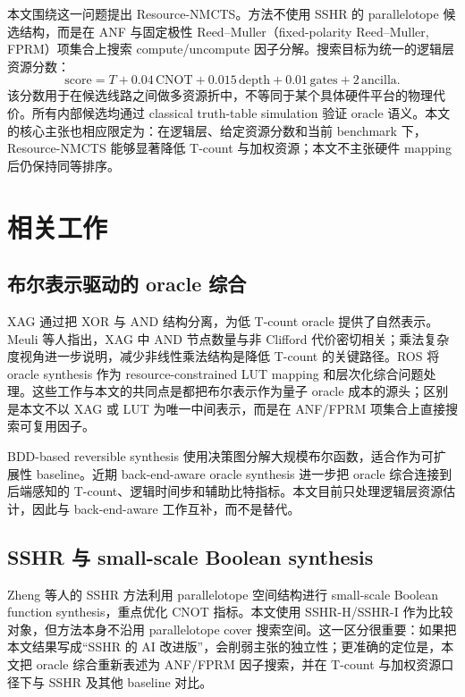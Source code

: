 \documentclass[UTF8,fontset=macnew,11pt]{ctexart}
\newcommand{\method}{Resource-NMCTS}
\newcommand{\score}{\mathrm{score}}
\begin{document}
本文围绕这一问题提出 \method{}。方法不使用 SSHR 的 parallelotope 候选结构，而是在 ANF 与固定极性 Reed--Muller（fixed-polarity Reed--Muller, FPRM）项集合上搜索 compute/uncompute 因子分解。搜索目标为统一的逻辑层资源分数：
\begin{equation}
  \score = T + 0.04\,\mathrm{CNOT} + 0.015\,\mathrm{depth}
         + 0.01\,\mathrm{gates} + 2\,\mathrm{ancilla}.
  \label{eq:score}
\end{equation}
该分数用于在候选线路之间做多资源折中，不等同于某个具体硬件平台的物理代价。所有内部候选均通过 classical truth-table simulation 验证 oracle 语义。本文的核心主张也相应限定为：在逻辑层、给定资源分数和当前 benchmark 下，\method{} 能够显著降低 T-count 与加权资源；本文不主张硬件 mapping 后仍保持同等排序。

\section{相关工作}

\subsection{布尔表示驱动的 oracle 综合}

XAG 通过把 XOR 与 AND 结构分离，为低 T-count oracle 提供了自然表示。Meuli 等人指出，XAG 中 AND 节点数量与非 Clifford 代价密切相关\cite{meuli2022xag}；乘法复杂度视角进一步说明，减少非线性乘法结构是降低 T-count 的关键路径\cite{meuli2019multiplicative}。ROS 将 oracle synthesis 作为 resource-constrained LUT mapping 和层次化综合问题处理\cite{meuli2020ros}。这些工作与本文的共同点是都把布尔表示作为量子 oracle 成本的源头；区别是本文不以 XAG 或 LUT 为唯一中间表示，而是在 ANF/FPRM 项集合上直接搜索可复用因子。

BDD-based reversible synthesis 使用决策图分解大规模布尔函数，适合作为可扩展性 baseline\cite{wille2009bdd}。近期 back-end-aware oracle synthesis 进一步把 oracle 综合连接到后端感知的 T-count、逻辑时间步和辅助比特指标\cite{yu2025backend}。本文目前只处理逻辑层资源估计，因此与 back-end-aware 工作互补，而不是替代。

\subsection{SSHR 与 small-scale Boolean synthesis}

Zheng 等人的 SSHR 方法利用 parallelotope 空间结构进行 small-scale Boolean function synthesis，重点优化 CNOT 指标\cite{zheng2025sshr}。本文使用 SSHR-H/SSHR-I 作为比较对象，但方法本身不沿用 parallelotope cover 搜索空间。这一区分很重要：如果把本文结果写成“SSHR 的 AI 改进版”，会削弱主张的独立性；更准确的定位是，本文把 oracle 综合重新表述为 ANF/FPRM 因子搜索，并在 T-count 与加权资源口径下与 SSHR 及其他 baseline 对比。
\end{document}
